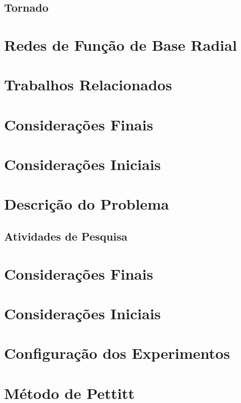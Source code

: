 \documentclass[qual, classic, a4paper]{ufbathesis}
\begin{document}
\subsection{Tornado}
\blindtext

\section{Redes de Função de Base Radial}
\blindtext
  
\section{Trabalhos Relacionados}
\blindtext

\section{Considerações Finais}
\blindtext

 \label{plano_pesquisa}
\section{Considerações Iniciais}
\blindtext

\section{Descrição do Problema}
\blindtext

\subsection{Atividades de Pesquisa}
\blindtext

\section{Considerações Finais}
\blindtext

 \label{experimentos_iniciais}
\section{Considerações Iniciais}
\blindtext

\section{Configuração dos Experimentos}
\blindtext

\section{Método de Pettitt}
\blindtext
\end{document}
